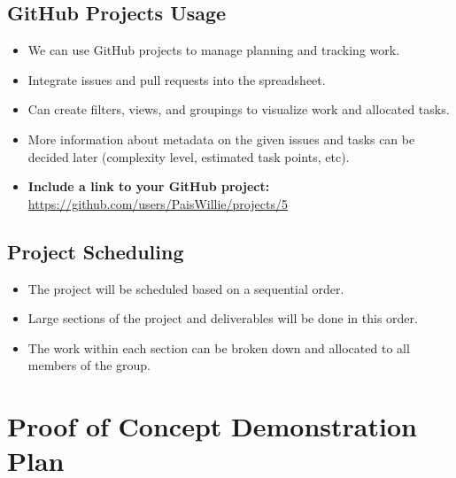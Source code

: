 \documentclass{article}
\begin{document}



\subsection*{GitHub Projects Usage}
\begin{itemize}
    \item We can use GitHub projects to manage planning and tracking work.
    \item Integrate issues and pull requests into the spreadsheet.
    \item Can create filters, views, and groupings to visualize work and allocated tasks.
    \item More information about metadata on the given issues and tasks can be decided later (complexity level, estimated task points, etc).
    \item \textbf{Include a link to your GitHub project:} \href{https://github.com/users/PaisWillie/projects/5}{https://github.com/users/PaisWillie/projects/5}

\end{itemize}

\subsection*{Project Scheduling}
\begin{itemize}
    \item The project will be scheduled based on a sequential order.
    \item Large sections of the project and deliverables will be done in this order.
    \item The work within each section can be broken down and allocated to all members of the group.
\end{itemize}

\section{Proof of Concept Demonstration Plan}
\end{document}
